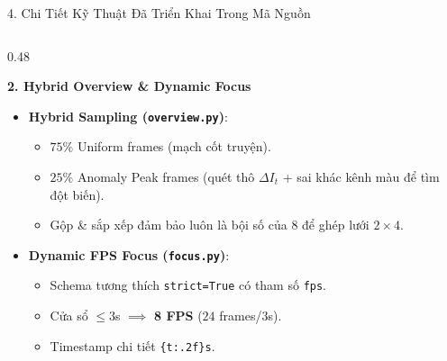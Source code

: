 \documentclass[aspectratio=169, 10pt]{beamer}
\begin{document}
\begin{frame}{4. Chi Tiết Kỹ Thuật Đã Triển Khai Trong Mã Nguồn}
\begin{columns}[T]
        \begin{column}{0.48\textwidth}
            \begin{block}{\textbf{2. Hybrid Overview \& Dynamic Focus}}
                \begin{itemize}
                    \item \textbf{Hybrid Sampling (\texttt{overview.py})}:
                    \begin{itemize}
                        \item $75\%$ Uniform frames (mạch cốt truyện).
                        \item $25\%$ Anomaly Peak frames (quét thô $\Delta I_t$ + sai khác kênh màu để tìm đột biến).
                        \item Gộp \& sắp xếp đảm bảo luôn là bội số của 8 để ghép lưới $2\times 4$.
                    \end{itemize}
                    \item \textbf{Dynamic FPS Focus (\texttt{focus.py})}:
                    \begin{itemize}
                        \item Schema tương thích \texttt{strict=True} có tham số \texttt{fps}.
                        \item Cửa sổ $\le 3$s $\implies$ \textbf{8 FPS} ($24$ frames/3s).
                        \item Timestamp chi tiết \texttt{\{t:.2f\}s}.
                    \end{itemize}
                \end{itemize}
            \end{block}
        \end{column}
    \end{columns}
\end{frame}
\end{document}
